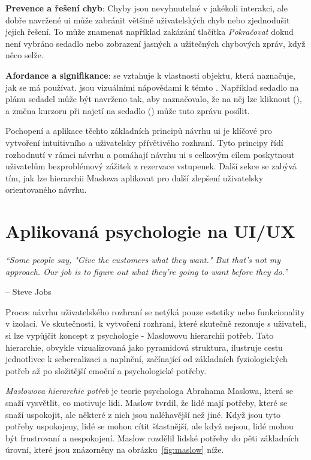 \textbf{Prevence a řešení chyb}: Chyby jsou nevyhnutelné v jakékoli interakci, ale dobře navržené \ac{ui} může zabránit většině uživatelských chyb nebo zjednodušit jejich řešení.
To může znamenat například zakázání tlačítka \textit{Pokračovat} dokud není vybráno sedadlo nebo zobrazení jasných a užitečných chybových zpráv, když něco selže.

\textbf{Afordance a signifikance}:  se vztahuje k vlastnosti objektu, která naznačuje, jak se má používat.
 jsou vizuálními nápovědami k témto .
Například sedadlo na plánu sedadel může být navrženo tak, aby naznačovalo, že na něj lze kliknout (), a změna kurzoru při najetí na sedadlo () může tuto zprávu posílit.

Pochopení a aplikace těchto základních principů návrhu \ac{ui} je klíčové pro vytvoření intuitivního a uživatelsky přívětivého rozhraní.
Tyto principy řídí rozhodnutí v rámci návrhu a pomáhají návrhu \ac{ui} s celkovým cílem poskytnout uživatelům bezproblémový zážitek z rezervace vstupenek.
Další sekce se zabývá tím, jak lze hierarchii Maslowa aplikovat pro další zlepšení uživatelsky orientovaného návrhu.

\section{Aplikovaná psychologie na UI/UX}
\label{sec:navrh-psychologie}

\epigraph{\textit{``Some people say, "Give the customers what they want." But that's not my approach. Our job is to figure out what they're going to want before they do.''}}{-- Steve Jobs}

Proces návrhu uživatelského rozhraní se netýká pouze estetiky nebo funkcionality v izolaci.
Ve skutečnosti, k vytvoření rozhraní, které skutečně rezonuje s uživateli, si lze vypůjčit koncept z psychologie - Maslowovu hierarchii potřeb.
Tato hierarchie, obvykle vizualizovaná jako pyramidová struktura, ilustruje cestu jednotlivce k seberealizaci a naplnění, začínající od základních fyziologických potřeb až po složitější emoční a psychologické potřeby.

\textit{Maslowova hierarchie potřeb} je teorie psychologa Abrahama Maslowa, která se snaží vysvětlit, co motivuje lidi.
Maslow tvrdil, že lidé mají potřeby, které se snaží uspokojit, ale některé z nich jsou naléhavější než jiné.
Když jsou tyto potřeby uspokojeny, lidé se mohou cítit šťastnější, ale když nejsou, lidé mohou být frustrovaní a nespokojení.\cite{maslow}
Maslow rozdělil lidské potřeby do pěti základních úrovní, které jsou znázorněny na obrázku~\ref{fig:maslow} níže.

